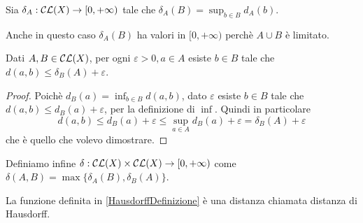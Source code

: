 \begin{definition}\label{DistanzaAsimmetrica}
	Sia $\delta_A:\mathcal{CL}(X)\to [0,+\infty)$ tale che $\delta_A(B)=\sup_{b\in B} d_A(b)$.
\end{definition}
\begin{remark}
	Anche in questo caso $\delta_A(B)$ ha valori in $[0,+\infty)$ perchè $A\cup B$ è limitato.
\end{remark}

\begin{lemma}\label{ApprossimazioneDistanzaAsimmetrica}
	Dati $A,B\in \mathcal{CL}(X)$, per ogni $\varepsilon>0, a\in A$ esiste $b\in B$ tale che $d(a,b)\le \delta_B(A)+\varepsilon$.
\end{lemma}
\begin{proof}
	Poichè $d_B(a)=\inf_{b\in B}d(a,b)$, dato $\varepsilon$ esiste $b\in B$ tale che $d(a,b)\le d_B(a)+\varepsilon$, per la definizione di $\inf$. Quindi in particolare
	\begin{equation*}
		d(a,b)\le d_B(a)+\varepsilon\le \sup_{a\in A}d_B(a)+\varepsilon=\delta_B(A)+\varepsilon
	\end{equation*}
	che è quello che volevo dimostrare.
\end{proof}



\begin{definition}\label{HausdorffDefinizione}
	Definiamo infine $\delta:\mathcal{CL}(X)\times \mathcal{CL}(X) \to [0,+\infty)$ come $\delta(A,B)=\max\{ \delta_A(B),\delta_B(A) \}$.
\end{definition}

\begin{theorem}
	La funzione definita in \cref{HausdorffDefinizione} è una distanza chiamata distanza di Hausdorff.
\end{theorem}

